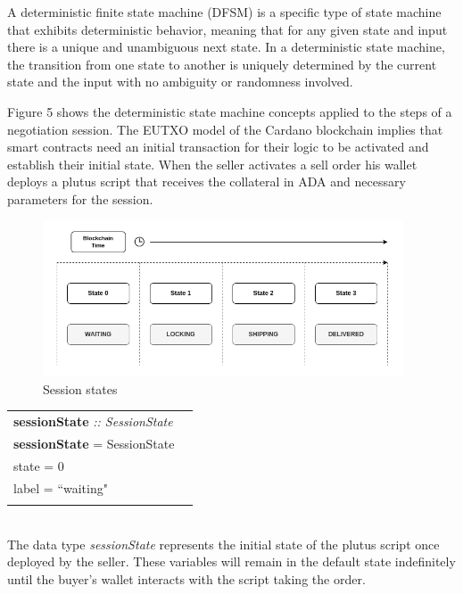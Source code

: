 \documentclass[12pt]{article}
\begin{document}
A deterministic finite state machine (DFSM) is a specific type of state machine that exhibits deterministic behavior, meaning that for any given state and input there is a unique and unambiguous next state. In a deterministic state machine, the transition from one state to another is uniquely determined by the current state and the input with no ambiguity or randomness involved.

Figure 5 shows the deterministic state machine concepts applied to the steps of a negotiation session. 
The EUTXO model of the Cardano blockchain implies that smart contracts need an initial transaction for their logic to be activated and establish their initial state.
When the seller activates a sell order his wallet deploys a plutus script that receives the collateral in ADA and necessary parameters for the session. 

\begin{figure}[ht]
  \centering
  \includegraphics[width=0.95\textwidth]{machine.png}
  \caption{Session states}
  \label{fig:States}
\end{figure}


\begin{tabular}{lr}
\textbf{sessionState} \emph{:: SessionState}\\
\textbf{sessionState}  = SessionState  \textbraceleft{}
\\ \hspace{54mm}state = 0
\\ \hspace{54mm}label = ``waiting"
\\\hspace{51mm}\textbraceright{} 
\end{tabular}
\\

 The data type \emph{sessionState} represents the initial state of the plutus script once deployed by the seller. These variables will remain in the default state indefinitely until the buyer's wallet interacts with the script taking the order.
\\
\end{document}
